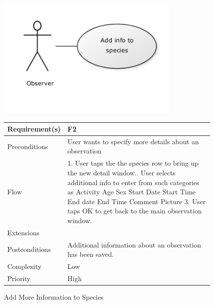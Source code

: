 \begin{figure}
		\centering
		\includegraphics[width=0.8\textwidth]{reqspec/uc/addinfo.png}
		\caption{Add More Information to Species}
		\label{fig:addmore}

\begin{tabular}[t]{|l|p{}|}\hline
	Requirement(s)&F2\\\hline
	Preconditions&User wants to specify more details about an observation\\\hline
	Flow& 1. User taps the the species row to bring up the new detail window.\newline
	2. User selects additional info to enter from such categories as \newline
	Activity \newline
	Age\newline
	Sex\newline
	Start Date\newline
	Start Time\newline
	End date \newline
	End Time \newline
	Comment \newline
	Picture \newline
	3. User taps OK to get back to the main observation window.\\\hline
	Extensions& \\\hline
	Postconditions& Additional information about an observation has been saved.\\\hline
	Complexity&Low\\\hline
	Priority&High\\\hline
\end{tabular}
\end{figure}

